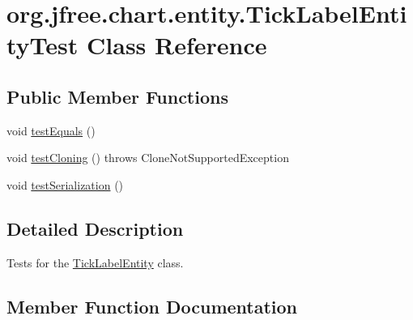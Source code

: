 \hypertarget{classorg_1_1jfree_1_1chart_1_1entity_1_1_tick_label_entity_test}{}\section{org.\+jfree.\+chart.\+entity.\+Tick\+Label\+Entity\+Test Class Reference}
\label{classorg_1_1jfree_1_1chart_1_1entity_1_1_tick_label_entity_test}
\subsection*{Public Member Functions}
\begin{DoxyCompactItemize}
\item 
void \mbox{\hyperlink{classorg_1_1jfree_1_1chart_1_1entity_1_1_tick_label_entity_test_a908aa15997b9084f83a2926382b9964f}{test\+Equals}} ()
\item 
void \mbox{\hyperlink{classorg_1_1jfree_1_1chart_1_1entity_1_1_tick_label_entity_test_ae09baea9b29ccfd2c1fa3ee04530f3b4}{test\+Cloning}} ()  throws Clone\+Not\+Supported\+Exception 
\item 
void \mbox{\hyperlink{classorg_1_1jfree_1_1chart_1_1entity_1_1_tick_label_entity_test_ad1d003a1c14d640bb30923b23ec4e15a}{test\+Serialization}} ()
\end{DoxyCompactItemize}


\subsection{Detailed Description}
Tests for the \mbox{\hyperlink{classorg_1_1jfree_1_1chart_1_1entity_1_1_tick_label_entity}{Tick\+Label\+Entity}} class. 

\subsection{Member Function Documentation}
\mbox{\label{classorg_1_1jfree_1_1chart_1_1entity_1_1_tick_label_entity_test_ae09baea9b29ccfd2c1fa3ee04530f3b4}} 
